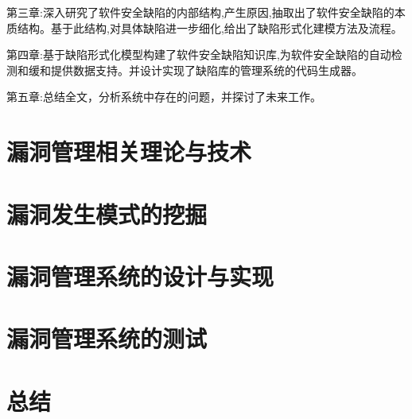 \documentclass[a4paper]{ctexrep}
\begin{document}
		第三章:深入研究了软件安全缺陷的内部结构,产生原因,抽取出了软件安全缺陷的本质结构。基于此结构,对具体缺陷进一步细化,给出了缺陷形式化建模方法及流程。
		
		第四章:基于缺陷形式化模型构建了软件安全缺陷知识库,为软件安全缺陷的自动检测和缓和提供数据支持。并设计实现了缺陷库的管理系统的代码生成器。
		
		第五章:总结全文，分析系统中存在的问题，并探讨了未来工作。
	\chapter{漏洞管理相关理论与技术}
	\chapter{漏洞发生模式的挖掘}
	\chapter{漏洞管理系统的设计与实现}
	\chapter{漏洞管理系统的测试}
	\chapter{总结}
	
	
	
\end{document}
